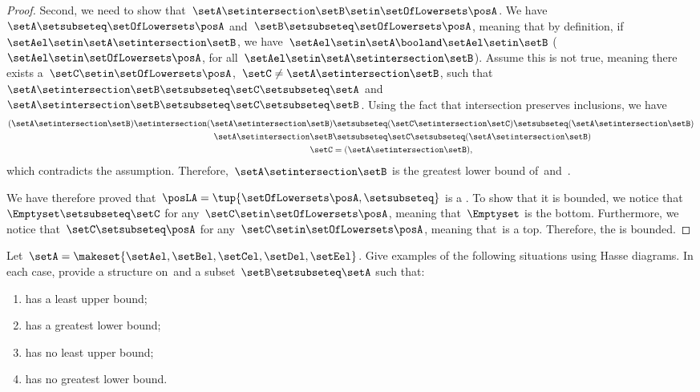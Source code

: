 \begin{proof}
    Second, we need to show that~$\setA \setintersection \setB\setin \setOfLowersets \posA$.
    We have~$\setA \setsubseteq \setOfLowersets \posA$ and~$\setB\setsubseteq \setOfLowersets \posA$, meaning that by definition, if~$\setAel\setin \setA\setintersection \setB$, we have~$\setAel \setin \setA\booland \setAel\setin \setB$ ($\setAel\setin \setOfLowersets \posA$, for all~$\setAel\setin \setA \setintersection \setB$).
    Assume this is not true, meaning there exists a~$\setC\setin \setOfLowersets \posA$,~$\setC\neq \setA\setintersection \setB$, such that~$\setA\setintersection \setB\setsubseteq \setC\setsubseteq \setA$ and~$\setA\setintersection \setB\setsubseteq \setC\setsubseteq \setB$.
    Using the fact that intersection preserves inclusions, we have
    \begin{equation}
        \begin{aligned}
            (\setA\setintersection \setB)
            \setintersection (\setA\setintersection \setB) & \setsubseteq (\setC \setintersection \setC) \setsubseteq (\setA\setintersection \setB) \\
            \setA\setintersection \setB                    & \setsubseteq \setC\setsubseteq (\setA\setintersection \setB) \\
            \setC                                          & =(\setA\setintersection \setB),
        \end{aligned}
    \end{equation}
    which contradicts the assumption.
    Therefore,~$\setA\setintersection \setB$ is the greatest lower bound of~\setA and~\setB.

    We have therefore proved that~$\posLA=\tup{\setOfLowersets \posA, {{\setsubseteq}}}$ is a .
    To show that it is bounded, we notice that~$\Emptyset \setsubseteq \setC$ for any~$\setC\setin \setOfLowersets \posA$, meaning that~$\Emptyset$ is the bottom.
    Furthermore, we notice that~$\setC\setsubseteq \posA$ for any~$\setC\setin \setOfLowersets \posA$, meaning that~\posA is a top.
    Therefore, the  is bounded.
\end{proof}

\vfill

\begin{gradedexercise}
    \label{ex:UpperLowerBounds}
    Let~$\setA = \makeset{\setAel, \setBel, \setCel, \setDel, \setEel }$.
    Give examples of the following situations using Hasse diagrams.
    In each case, provide a  structure on~\setA and a subset~$\setB \setsubseteq \setA$ such that:
    \begin{enumerate}
        \item \setB has a least upper bound;
        \item \setB has a greatest lower bound;
        \item \setB has no least upper bound;
        \item \setB has no greatest lower bound.
    \end{enumerate}
\end{gradedexercise}

